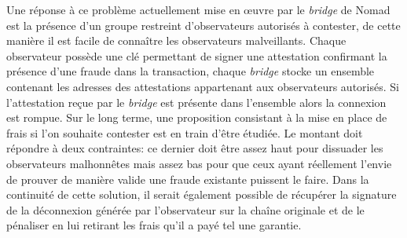 Une réponse à ce problème actuellement mise en œuvre par le \textit{bridge} de \gls{Nomad} est la présence d’un groupe restreint d’observateurs autorisés à contester, de cette manière il est facile de connaître les observateurs malveillants. Chaque observateur possède une clé permettant de signer une attestation confirmant la présence d’une fraude dans la transaction, chaque \textit{bridge} stocke un ensemble contenant les adresses des attestations appartenant aux observateurs autorisés. Si l’attestation reçue par le \textit{bridge} est présente dans l’ensemble alors la connexion est rompue\cite{NomadDocsWatcher}.
Sur le long terme, une proposition consistant à la mise en place de frais si l’on souhaite contester est en train d’être étudiée. Le montant doit répondre à deux contraintes: ce dernier doit être assez haut pour dissuader les observateurs malhonnêtes mais assez bas pour que ceux ayant réellement l’envie de prouver de manière valide une fraude existante puissent le faire. Dans la continuité de cette solution, il serait également possible de récupérer la signature de la déconnexion générée par l’observateur sur la chaîne originale et de le pénaliser en lui retirant les frais qu’il a payé tel une garantie\cite{OptimisticBhuptani}.

